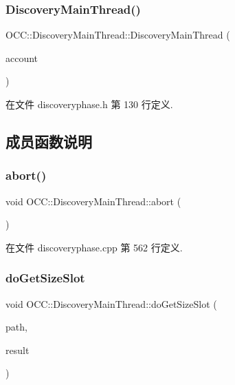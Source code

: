 \subsubsection{\texorpdfstring{Discovery\+Main\+Thread()}{DiscoveryMainThread()}}
{\footnotesize\ttfamily O\+C\+C\+::\+Discovery\+Main\+Thread\+::\+Discovery\+Main\+Thread (\begin{DoxyParamCaption}\item[{\hyperlink{namespace_o_c_c_a848616aedb9188e223c6b9867757fe69}{Account\+Ptr}}]{account }\end{DoxyParamCaption})}



在文件 discoveryphase.\+h 第 130 行定义.



\subsection{成员函数说明}
\mbox{\label{class_o_c_c_1_1_discovery_main_thread_a5961ddefb43c64c7c90e896eb9ee6860}} 
\subsubsection{\texorpdfstring{abort()}{abort()}}
{\footnotesize\ttfamily void O\+C\+C\+::\+Discovery\+Main\+Thread\+::abort (\begin{DoxyParamCaption}{ }\end{DoxyParamCaption})}



在文件 discoveryphase.\+cpp 第 562 行定义.

\mbox{\label{class_o_c_c_1_1_discovery_main_thread_aeed681826c83ddad1fb0201edd435dc6}} 
\subsubsection{\texorpdfstring{do\+Get\+Size\+Slot}{doGetSizeSlot}}
{\footnotesize\ttfamily void O\+C\+C\+::\+Discovery\+Main\+Thread\+::do\+Get\+Size\+Slot (\begin{DoxyParamCaption}\item[{const Q\+String \&}]{path,  }\item[{qint64 $\ast$}]{result }\end{DoxyParamCaption})\hspace{0.3cm}{\ttfamily [slot]}}



